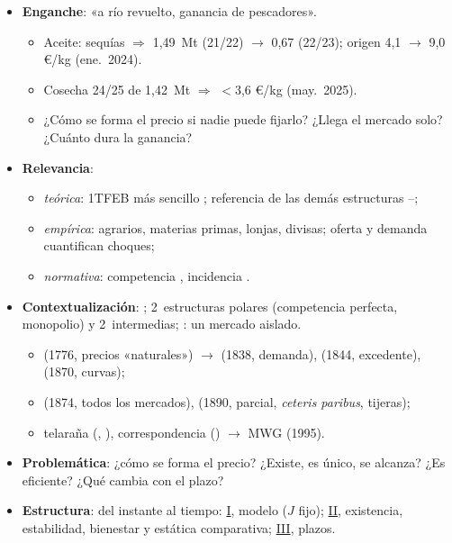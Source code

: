 \documentclass{article}
\begin{document}
\cabecerarepaso
\begin{columnas}

\begin{itemize}
\item \textbf{Enganche}: «a río revuelto, ganancia de pescadores».
  \begin{itemize}
  \item Aceite: sequías $\Rightarrow$ 1,49~Mt (21/22) $\to$ 0,67 (22/23); origen 4,1 $\to$ 9,0 €/kg (ene.\ 2024).
  \item Cosecha 24/25 de 1,42~Mt $\Rightarrow$ $<$3,6 €/kg (may.\ 2025).
  \item ¿Cómo se forma el precio si nadie puede fijarlo? ¿Llega el mercado solo? ¿Cuánto dura la ganancia?
  \end{itemize}
\item \textbf{Relevancia}:
  \begin{itemize}
  \item \emph{teórica}: 1TFEB más sencillo ; referencia de las demás estructuras --;
  \item \emph{empírica}: agrarios, materias primas, lonjas, divisas; oferta y demanda cuantifican choques;
  \item \emph{normativa}: competencia , incidencia .
  \end{itemize}
\item \textbf{Contextualización}: ; 2~estructuras polares (competencia perfecta, monopolio) y 2~intermedias; : un mercado aislado.
  \begin{itemize}
  \item {} (1776, precios «naturales») $\to$  (1838, demanda),  (1844, excedente),  (1870, curvas);
  \item {} (1874, todos los mercados),  (1890, parcial, \emph{ceteris paribus}, tijeras);
  \item telaraña (, ), correspondencia () $\to$ MWG (1995).
  \end{itemize}
\item \textbf{Problemática}: ¿cómo se forma el precio? ¿Existe, es único, se alcanza? ¿Es eficiente? ¿Qué cambia con el plazo?
\item \textbf{Estructura}: del instante al tiempo: \hyperref[rep:I]{I}, modelo ($J$ fijo); \hyperref[rep:II]{II}, existencia, estabilidad, bienestar y estática comparativa; \hyperref[rep:III]{III}, plazos.

\end{itemize}
\end{columnas}
\end{document}
